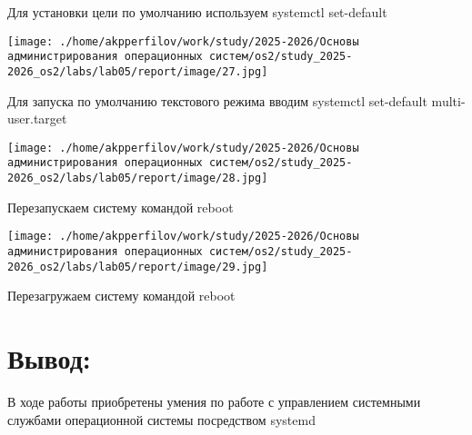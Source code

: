 \documentclass[
  english,
  russian,
  12pt,
  a4paper,
  DIV=11,
  numbers=noendperiod]{scrreprt}
\begin{document}
Для установки цели по умолчанию используем systemctl set-default

\texttt{[image: ./home/akpperfilov/work/study/2025-2026/Основы администрирования операционных систем/os2/study\_2025-2026\_os2/labs/lab05/report/image/27.jpg]}

Для запуска по умолчанию текстового режима вводим systemctl set-default
multi-user.target

\texttt{[image: ./home/akpperfilov/work/study/2025-2026/Основы администрирования операционных систем/os2/study\_2025-2026\_os2/labs/lab05/report/image/28.jpg]}

Перезапускаем систему командой reboot

\texttt{[image: ./home/akpperfilov/work/study/2025-2026/Основы администрирования операционных систем/os2/study\_2025-2026\_os2/labs/lab05/report/image/29.jpg]}

Перезагружаем систему командой reboot

\chapter{Вывод:}\label{ux432ux44bux432ux43eux434}

В ходе работы приобретены умения по работе с управлением системными
службами операционной системы посредством systemd


\printbibliography
\end{document}
